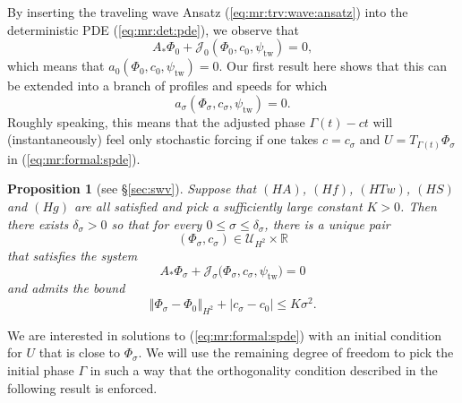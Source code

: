 \documentclass[10pt]{articleHJ}
\newcommand{\Real}{\mathbb{R}}							%
\newcommand{\abs}[1]{\left\vert#1\right\vert}			%
\newcommand{\norm}[1]{\left\Vert#1\right\Vert}		%
\newcommand{\sref}[1]{(\ref{#1})}                       %
\newtheorem{prop}[thm]{Proposition}
\numberwithin{equation}{section}
\begin{document}
By inserting the traveling wave Ansatz
\sref{eq:mr:trv:wave:ansatz} into the deterministic PDE
\sref{eq:mr:det:pde},
we observe that
\begin{equation}
A_* \Phi_0 + \mathcal{J}_0(\Phi_0, c_0, \psi_{\mathrm{tw}}) = 0,
\end{equation}
which means that $a_0(\Phi_0, c_0, \psi_{\mathrm{tw}}) = 0$.
Our first result here shows that this can be extended
into a branch of profiles and speeds
for which
\begin{equation}
a_{\sigma}(\Phi_{\sigma}, c_{\sigma}, \psi_{\mathrm{tw}}) = 0.
\end{equation}
Roughly speaking,
this means that
the adjusted phase $\Gamma(t) - c t$
will (instantaneously) feel only stochastic forcing
if one takes $c = c_{\sigma}$
and $U = T_{\Gamma(t)} \Phi_{\sigma}$
in \sref{eq:mr:formal:spde}.




\begin{prop}[{see \S\ref{sec:swv}}]
\label{prp:mr:swv:ex}
Suppose that $(HA)$, $(Hf)$,
$(HTw)$, $(HS)$ and $(Hg)$
are all satisfied and pick a sufficiently large
constant $K > 0$. Then there exists $\delta_{\sigma} > 0$
so that %
for every $0 \le \sigma \le \delta_{\sigma}$,
there is a unique pair
\begin{equation}
(\Phi_{\sigma},c_{\sigma}) \in   \mathcal{U}_{H^2}  \times \Real
\end{equation}
that satisfies the system
\begin{equation}
\label{eq:mr:prop:swv:eq}
  A_* \Phi_{\sigma} +
   \mathcal{J}_{\sigma}\big(\Phi_{\sigma} , c_{\sigma}, \psi_{\mathrm{tw}} \big) = 0
\end{equation}
and admits the bound
\begin{equation}
\label{eq:mr:prp:swv:bnd:phi:sigma}
\norm{\Phi_{\sigma} - \Phi_0}_{H^2} + \abs{c_{\sigma} - c_{0} } \le K \sigma^2 .
\end{equation}
\end{prop}

We are interested in solutions
to \sref{eq:mr:formal:spde} with
an initial condition for $U$
that is close to $\Phi_{\sigma}$.
We will use the remaining degree of freedom
to pick the initial phase
$\Gamma$ in such a way that the orthogonality
condition described in the following result
is enforced.
\end{document}
